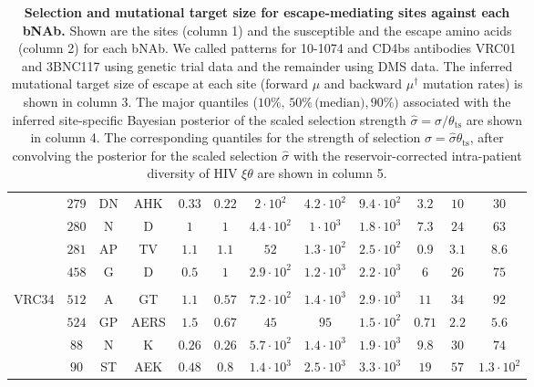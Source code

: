 \documentclass[11pt]{article}
\newcommand{\ts}{{\text{ts}}}
\begin{document}
\begin{table*}[h!]
{\begin{tabular}{lc|cc|cc|ccc|ccc}
 & $279$ & DN & AHK & $0.33$ & $0.22$ & $2 \cdot 10^{2}$ & $4.2 \cdot 10^{2}$ & $9.4 \cdot 10^{2}$ & $3.2$ & $10$ & $30$\\
 & $280$ & N & D & $1$ & $1$ & $4.4 \cdot 10^{2}$ & $1 \cdot 10^{3}$ & $1.8 \cdot 10^{3}$ & $7.3$ & $24$ & $63$\\
 & $281$ & AP & TV & $1.1$ & $1.1$ & $52$ & $1.3 \cdot 10^{2}$ & $2.5 \cdot 10^{2}$ & $0.9$ & $3.1$ & $8.6$\\
 & $458$ & G & D & $0.5$ & $1$ & $2.9 \cdot 10^{2}$ & $1.2 \cdot 10^{3}$ & $2.2 \cdot 10^{3}$ & $6$ & $26$ & $75$\\
\\
\multirow{5}{*}{VRC34}
 & $512$ & A & GT & $1.1$ & $0.57$ & $7.2 \cdot 10^{2}$ & $1.4 \cdot 10^{3}$ & $2.9 \cdot 10^{3}$ & $11$ & $34$ & $92$\\
 & $524$ & GP & AERS & $1.5$ & $0.67$ & $45$ & $95$ & $1.5 \cdot 10^{2}$ & $0.71$ & $2.2$ & $5.6$\\
 & $88$ & N & K & $0.26$ & $0.26$ & $5.7 \cdot 10^{2}$ & $1.4 \cdot 10^{3}$ & $1.9 \cdot 10^{3}$ & $9.8$ & $30$ & $74$\\
 & $90$ & ST & AEK & $0.48$ & $0.8$ & $1.4 \cdot 10^{3}$ & $2.5 \cdot 10^{3}$ & $3.3 \cdot 10^{3}$ & $19$ & $57$ & $1.3 \cdot 10^{2}$\\
\end{tabular}
} 
\caption{{\bf Selection and mutational target size for escape-mediating sites against each bNAb.} Shown are the sites (column 1) and the susceptible and the escape amino acids (column 2) for each bNAb. We called patterns for 10-1074 and CD4bs antibodies VRC01 and 3BNC117 using genetic trial data and the remainder using DMS data. The inferred mutational target size of escape at each site (forward $\mu$ and backward $\mu^\dagger$ mutation rates) is shown in column 3. 
The major quantiles ($10\%, \,50\%\, \text{(median)}, 90\%)$ associated with the inferred site-specific Bayesian posterior of the  scaled selection strength $\hat{\sigma} = \sigma/ \theta_\ts$  are shown in column 4. The corresponding quantiles for the strength of selection  $\sigma = \hat{\sigma} \theta_\ts$, after convolving the   posterior for the scaled selection $\hat{\sigma}$ with  the reservoir-corrected intra-patient diversity of HIV $\xi \theta$  are shown in column 5.  
}
\label{tab:full_antibody_data}
\end{table*}
\end{document}
